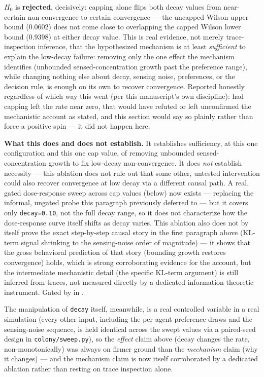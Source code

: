 \documentclass[
  english,
]{article}
\theoremstyle{definition}
\begin{document}
\(H_0\) is \textbf{rejected}, decisively: capping alone flips both decay
values from near-certain non-convergence to certain convergence --- the
uncapped Wilson upper bound (\(0.0602\)) does not come close to
overlapping the capped Wilson lower bound (\(0.9398\)) at either decay
value. This is real evidence, not merely trace-inspection inference,
that the hypothesized mechanism is at least \emph{sufficient} to explain
the low-decay failure: removing only the one effect the mechanism
identifies (unbounded sensed-concentration growth past the preference
range), while changing nothing else about decay, sensing noise,
preferences, or the decision rule, is enough on its own to recover
convergence. Reported honestly regardless of which way this went (per
this manuscript's own discipline): had capping left the rate near zero,
that would have refuted or left unconfirmed the mechanistic account as
stated, and this section would say so plainly rather than force a
positive spin --- it did not happen here.

\textbf{What this does and does not establish.} It establishes
sufficiency, at this one configuration and this one cap value, of
removing unbounded sensed-concentration growth to fix low-decay
non-convergence. It does \emph{not} establish necessity --- this
ablation does not rule out that some other, untested intervention could
also recover convergence at low decay via a different causal path. A
real, gated dose-response sweep across cap values (below) now exists ---
replacing the informal, ungated probe this paragraph previously deferred
to --- but it covers only \texttt{decay=0.10}, not the full decay range,
so it does not characterize how the dose-response curve itself shifts as
decay varies. This ablation also does not by itself prove the exact
step-by-step causal story in the first paragraph above (KL-term signal
shrinking to the sensing-noise order of magnitude) --- it shows that the
gross behavioral prediction of that story (bounding growth restores
convergence) holds, which is strong corroborating evidence for the
account, but the intermediate mechanistic detail (the specific KL-term
argument) is still inferred from traces, not measured directly by a
dedicated information-theoretic instrument. Gated by
in .

The manipulation of \texttt{decay} itself, meanwhile, is a real
controlled variable in a real simulation (every other input, including
the per-agent preference draws and the sensing-noise sequence, is held
identical across the swept values via a paired-seed design in
\texttt{colony/sweep.py}), so the \emph{effect} claim above (decay
changes the rate, non-monotonically) was always on firmer ground than
the \emph{mechanism} claim (why it changes) --- and the mechanism claim
is now itself corroborated by a dedicated ablation rather than resting
on trace inspection alone.
\end{document}
